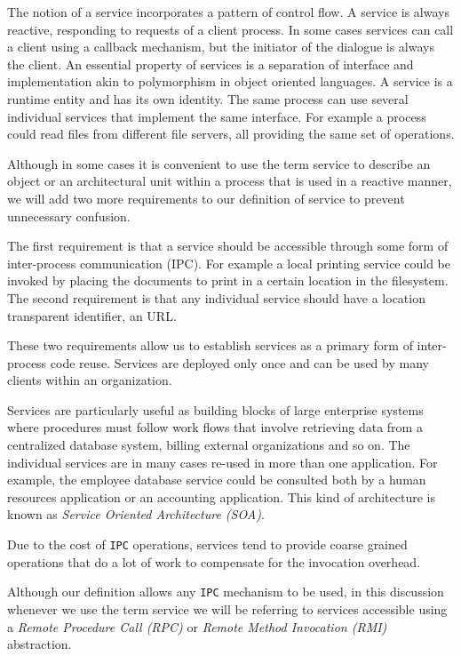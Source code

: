 The notion of a service incorporates a pattern of control flow. A service is always reactive, responding to requests of a client process. In some cases
services can call a client using a callback mechanism, but the initiator of the dialogue is always the client. An essential property of services is a
separation of interface and implementation akin to polymorphism in object oriented languages. A service is a runtime entity and has its own identity.
The same process can use several individual services that implement the same interface. For example a process could read files from different file
servers, all providing the same set of operations.

Although in some cases it is convenient to use the term service to describe an object or an architectural unit within a process that is used in
a reactive manner, we will add two more requirements to our definition of service to prevent unnecessary confusion.

The first requirement is that a service should be accessible through some form of inter-process communication (IPC). For example a local printing service
could be invoked by placing the documents to print in a certain location in the filesystem. The second requirement is that any individual service
should have a location transparent identifier, an URL.

These two requirements allow us to establish services as a primary form of inter-process code reuse. Services are deployed only once and can be used
by many clients within an organization.

Services are particularly useful as building blocks of large enterprise systems where procedures must follow work flows that involve retrieving data
from a centralized database system, billing external organizations and so on. The individual services are in many cases re-used in more than one
application. For example, the employee database service could be consulted both by a human resources application or an accounting application.
This kind of architecture is known as \emph{Service Oriented Architecture (SOA)}.

Due to the cost of \texttt{IPC} operations, services tend to provide coarse grained operations that do a lot of work to compensate for the invocation
overhead.

Although our definition allows any \texttt{IPC} mechanism to be used, in this discussion whenever we use the term service we will be referring to
services accessible using a \emph{Remote Procedure Call (RPC)} or \emph{Remote Method Invocation (RMI)} abstraction.

